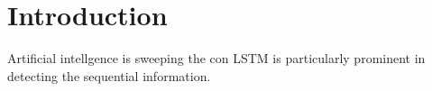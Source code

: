 \section{Introduction}
Artificial intellgence is sweeping the con
LSTM is particularly prominent in detecting the sequential information. 